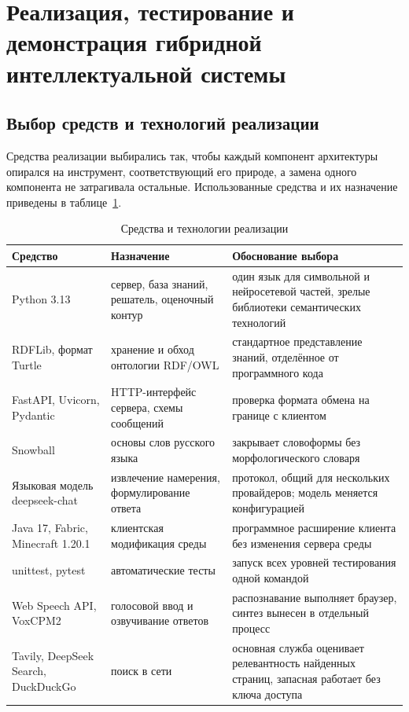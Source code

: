\section{Реализация, тестирование и демонстрация гибридной интеллектуальной системы}

\subsection{Выбор средств и технологий реализации}

Средства реализации выбирались так, чтобы каждый компонент архитектуры опирался на
инструмент, соответствующий его природе, а замена одного компонента не затрагивала
остальные. Использованные средства и их назначение приведены в
таблице~\ref{tab:tools}.

\begin{table}[!htb]
  \centering
  \caption{Средства и технологии реализации}
  \label{tab:tools}
  \begin{tabular}{|>{\raggedright\arraybackslash}p{}
                  |>{\raggedright\arraybackslash}p{}
                  |>{\raggedright\arraybackslash}p{}|}
    \hline
    Средство & Назначение & Обоснование выбора \\
    \hline
    Python 3.13 & сервер, база знаний, решатель, оценочный контур & один язык для символьной и нейросетевой частей, зрелые библиотеки семантических технологий \\
    \hline
    RDFLib, формат Turtle & хранение и обход онтологии RDF/OWL & стандартное представление знаний, отделённое от программного кода \\
    \hline
    FastAPI, Uvicorn, Pydantic & HTTP-интерфейс сервера, схемы сообщений & проверка формата обмена на границе с клиентом \\
    \hline
    Snowball & основы слов русского языка & закрывает словоформы без морфологического словаря \\
    \hline
    Языковая модель deepseek-chat & извлечение намерения, формулирование ответа & протокол, общий для нескольких провайдеров; модель меняется конфигурацией \\
    \hline
    Java 17, Fabric, Minecraft 1.20.1 & клиентская модификация среды & программное расширение клиента без изменения сервера среды \\
    \hline
    unittest, pytest & автоматические тесты & запуск всех уровней тестирования одной командой \\
    \hline
    Web Speech API, VoxCPM2 & голосовой ввод и озвучивание ответов & распознавание выполняет браузер, синтез вынесен в отдельный процесс \\
    \hline
    Tavily, DeepSeek Search, DuckDuckGo & поиск в сети & основная служба оценивает релевантность найденных страниц, запасная работает без ключа доступа \\
    \hline
  \end{tabular}
\end{table}

